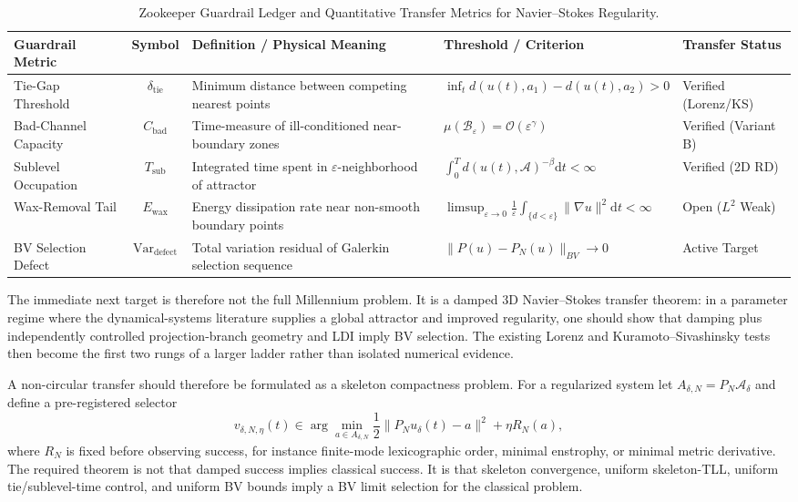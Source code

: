 \documentclass[12pt,a4paper]{article}
\theoremstyle{definition}
\theoremstyle{plain}
\theoremstyle{remark}
\begin{document}
\begin{table}[htbp]
\centering
\caption{Zookeeper Guardrail Ledger and Quantitative Transfer Metrics for Navier--Stokes Regularity.}
\label{tab:zookeeper_guardrails}
\vspace{0.2cm}
\footnotesize
\begin{tabularx}{\textwidth}{>{\raggedright\arraybackslash}p{2.5cm} c X >{\raggedright\arraybackslash}p{4.8cm} >{\raggedright\arraybackslash}p{1.9cm}}
\toprule
\textbf{Guardrail Metric} & \textbf{Symbol} & \textbf{Definition / Physical Meaning} & \textbf{Threshold / Criterion} & \textbf{Transfer Status} \\
\midrule
Tie-Gap Threshold & $\delta_{\text{tie}}$ & Minimum distance between competing nearest points & $\inf_{t} d(u(t), a_1) - d(u(t), a_2) > 0$ & Verified (Lorenz/KS) \\
Bad-Channel Capacity & $C_{\text{bad}}$ & Time-measure of ill-conditioned near-boundary zones & $\mu(\mathcal{B}_\varepsilon) = \mathcal{O}(\varepsilon^\gamma)$ & Verified (Variant B) \\
Sublevel Occupation & $T_{\text{sub}}$ & Integrated time spent in $\varepsilon$-neighborhood of attractor & $\int_0^T d(u(t),\mathcal{A})^{-\beta} \mathrm{d}t < \infty$ & Verified (2D RD) \\
Wax-Removal Tail & $E_{\text{wax}}$ & Energy dissipation rate near non-smooth boundary points & $\limsup_{\varepsilon\to 0} \frac{1}{\varepsilon}\int_{\{d<\varepsilon\}} \|\nabla u\|^2 \mathrm{d}t < \infty$ & Open ($L^2$ Weak) \\
BV Selection Defect & $\text{Var}_{\text{defect}}$ & Total variation residual of Galerkin selection sequence & $\|P(u) - P_N(u)\|_{BV} \to 0$ & Active Target \\
\bottomrule
\end{tabularx}
\end{table}

The immediate next target is therefore not the full Millennium problem.
It is a damped 3D Navier--Stokes transfer theorem: in a parameter regime
where the dynamical-systems literature supplies a global attractor and
improved regularity, one should show that damping plus independently
controlled projection-branch geometry and LDI imply BV selection.  The existing
Lorenz and Kuramoto--Sivashinsky tests then become the first two rungs
of a larger ladder rather than isolated numerical evidence.

A non-circular transfer should therefore be formulated as a skeleton
compactness problem.  For a regularized system let
\(A_{\delta,N}=P_N\mathcal{A}_\delta\) and define a pre-registered selector
\[
v_{\delta,N,\eta}(t)\in\arg\min_{a\in A_{\delta,N}}
\frac12\|P_Nu_\delta(t)-a\|^2+\eta R_N(a),
\]
where \(R_N\) is fixed before observing success, for instance
finite-mode lexicographic order, minimal enstrophy, or minimal metric
derivative.  The required theorem is not that damped success implies
classical success.  It is that skeleton convergence, uniform
skeleton-TLL, uniform tie/sublevel-time control, and uniform BV bounds
imply a BV limit selection for the classical problem.
\end{document}
